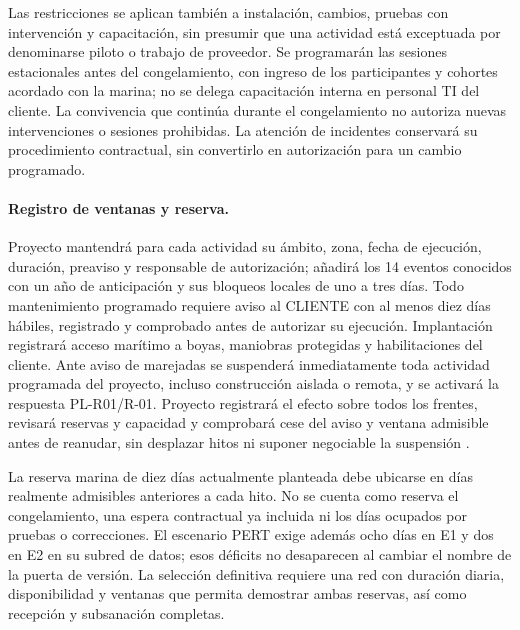 Las restricciones se aplican también a instalación, cambios, pruebas con intervención y capacitación, sin presumir que una actividad está exceptuada por denominarse piloto o trabajo de proveedor. Se programarán las sesiones estacionales antes del congelamiento, con ingreso de los participantes y cohortes acordado con la marina; no se delega capacitación interna en personal TI del cliente. La convivencia que continúa durante el congelamiento no autoriza nuevas intervenciones o sesiones prohibidas. La atención de incidentes conservará su procedimiento contractual, sin convertirlo en autorización para un cambio programado.

\paragraph{Registro de ventanas y reserva.}
Proyecto mantendrá para cada actividad su ámbito, zona, fecha de ejecución, duración, preaviso y responsable de autorización; añadirá los 14 eventos conocidos con un año de anticipación y sus bloqueos locales de uno a tres días. Todo mantenimiento programado requiere aviso al CLIENTE con al menos diez días hábiles, registrado y comprobado antes de autorizar su ejecución. Implantación registrará acceso marítimo a boyas, maniobras protegidas y habilitaciones del cliente. Ante aviso de marejadas se suspenderá inmediatamente toda actividad programada del proyecto, incluso construcción aislada o remota, y se activará la respuesta PL-R01/R-01. Proyecto registrará el efecto sobre todos los frentes, revisará reservas y capacidad y comprobará cese del aviso y ventana admisible antes de reanudar, sin desplazar hitos ni suponer negociable la suspensión \parencites[art.~20, p.~15]{bases-admin}[RT-10.05, p.~22]{bases-transversales}[cap.~10, restricción 12, p.~26; numeral 13.2, p.~29]{caso07}.

La reserva marina de diez días actualmente planteada debe ubicarse en días realmente admisibles anteriores a cada hito. No se cuenta como reserva el congelamiento, una espera contractual ya incluida ni los días ocupados por pruebas o correcciones. El escenario PERT exige además ocho días en E1 y dos en E2 en su subred de datos; esos déficits no desaparecen al cambiar el nombre de la puerta de versión. La selección definitiva requiere una red con duración diaria, disponibilidad y ventanas que permita demostrar ambas reservas, así como recepción y subsanación completas.

